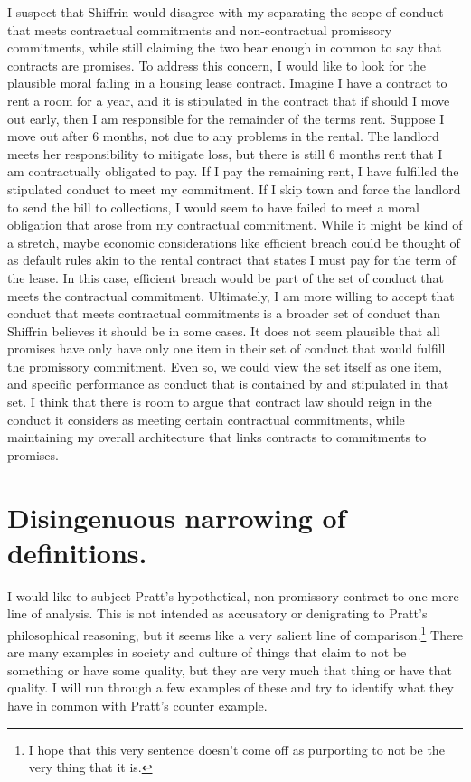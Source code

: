 I suspect that Shiffrin would disagree with my separating the scope of
conduct that meets contractual commitments and non-contractual
promissory commitments, while still claiming the two bear enough in
common to say that contracts are promises. To address this concern, I
would like to look for the plausible moral failing in a housing lease
contract. Imagine I have a contract to rent a room for a year, and it is
stipulated in the contract that if should I move out early, then I am
responsible for the remainder of the terms rent. Suppose I move out
after 6 months, not due to any problems in the rental. The landlord
meets her responsibility to mitigate loss, but there is still 6 months
rent that I am contractually obligated to pay. If I pay the remaining
rent, I have fulfilled the stipulated conduct to meet my commitment. If
I skip town and force the landlord to send the bill to collections, I
would seem to have failed to meet a moral obligation that arose from my
contractual commitment. While it might be kind of a stretch, maybe
economic considerations like efficient breach could be thought of as
default rules akin to the rental contract that states I must pay for the
term of the lease. In this case, efficient breach would be part of the
set of conduct that meets the contractual commitment. Ultimately, I am
more willing to accept that conduct that meets contractual commitments
is a broader set of conduct than Shiffrin believes it should be in some
cases. It does not seem plausible that all promises have only have only
one item in their set of conduct that would fulfill the promissory
commitment. Even so, we could view the set itself as one item, and
specific performance as conduct that is contained by and stipulated in
that set. I think that there is room to argue that contract law should
reign in the conduct it considers as meeting certain contractual
commitments, while maintaining my overall architecture that links
contracts to commitments to promises.

\section{Disingenuous narrowing of definitions.}

I would like to subject Pratt's hypothetical, non-promissory contract to
one more line of analysis. This is not intended as accusatory or
denigrating to Pratt's philosophical reasoning, but it seems like a very
salient line of comparison.\footnote{I hope that this very sentence
  doesn't come off as purporting to not be the very thing that it is.}
There are many examples in society and culture of things that claim to
not be something or have some quality, but they are very much that thing
or have that quality. I will run through a few examples of these and try
to identify what they have in common with Pratt's counter example.

